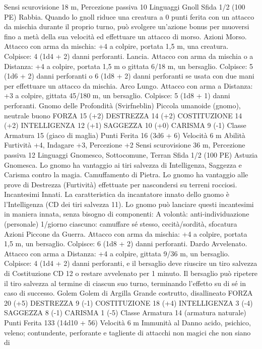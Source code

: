 \begin{multicols}{2}
Sensi scurovisione 18 m, Percezione passiva 10
Linguaggi Gnoll
Sfida 1/2 (100 PE)
Rabbia. Quando lo gnoll riduce una creatura a 0 punti ferita con
un attacco da mischia durante il proprio turno, può svolgere
un’azione bonus per muoversi fino a metà della sua velocità ed
effettuare un attacco di morso.
Azioni
Morso. Attacco con arma da mischia: +4 a colpire, portata 1,5
m, una creatura.
Colpisce: 4 (1d4 + 2) danni perforanti.
Lancia. Attacco con arma da mischia o a Distanza: +4 a colpire,
portata 1,5 m o gittata 6/18 m, un bersaglio.
Colpisce: 5 (1d6 + 2) danni perforanti o 6 (1d8 + 2) danni
perforanti se usata con due mani per effettuare un attacco da
mischia.
Arco Lungo. Attacco con arma a Distanza: +3 a colpire, gittata
45/180 m, un bersaglio.
Colpisce: 5 (1d8 + 1) danni perforanti.
Gnomo delle
Profondità (Svirfneblin)
Piccola umanoide (gnomo), neutrale buono
FORZA 15 (+2)
DESTREZZA 14 (+2)
COSTITUZIONE 14 (+2)
INTELLIGENZA 12 (+1)
SAGGEZZA 10 (+0)
CARISMA 9 (-1)
Classe Armatura 15 (giaco di maglia)
Punti Ferita 16 (3d6 + 6)
Velocità 6 m
Abilità Furtività +4, Indagare +3, Percezione +2
Sensi scurovisione 36 m, Percezione passiva 12
Linguaggi Gnomesco, Sottocomune, Terran
Sfida 1/2 (100 PE)
Astuzia Gnomesca. Lo gnomo ha vantaggio ai tiri salvezza di
Intelligenza, Saggezza e Carisma contro la magia.
Camuffamento di Pietra. Lo gnomo ha vantaggio alle prove di
Destrezza (Furtività) effettuate per nascondersi su terreni
rocciosi.
Incantesimi Innati. La caratteristica da incantatore innato dello
gnomo è l’Intelligenza (CD dei tiri salvezza 11). Lo gnomo può
lanciare questi incantesimi in maniera innata, senza bisogno di
componenti:
A volontà: anti-individuazione (personale)
1/giorno ciascuno: camuffare sé stesso, cecità/sordità, sfocatura
Azioni
Piccone da Guerra. Attacco con arma da mischia: +4 a colpire,
portata 1,5 m, un bersaglio.
Colpisce: 6 (1d8 + 2) danni perforanti.
Dardo Avvelenato. Attacco con arma a Distanza: +4 a colpire,
gittata 9/36 m, un bersaglio.
Colpisce: 4 (1d4 + 2) danni perforanti, e il bersaglio deve
riuscire un tiro salvezza di Costituzione CD 12 o restare
avvelenato per 1 minuto. Il bersaglio può ripetere il tiro salvezza
al termine di ciascun suo turno, terminando l’effetto su di sé in
caso di successo.
Golem
Golem di Argilla
Grande costrutto, disallineato
FORZA 20 (+5)
DESTREZZA 9 (-1)
COSTITUZIONE 18 (+4)
INTELLIGENZA 3 (-4)
SAGGEZZA 8 (-1)
CARISMA 1 (-5)
Classe Armatura 14 (armatura naturale)
Punti Ferita 133 (14d10 + 56)
Velocità 6 m
Immunità al Danno acido, psichico, veleno; contundente,
perforante e tagliente di attacchi non magici che non siano di

\end{multicols}
